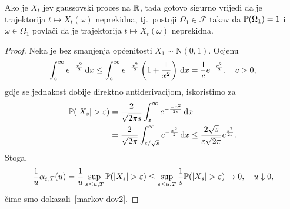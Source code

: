 \documentclass[main.tex]{subfiles}
\begin{document}
\begin{teorem}\label{tm:aditgauss}
	Ako je \( X_t \) \levy jev gaussovski proces na \( \R \), tada gotovo sigurno vrijedi da je trajektorija \( t \mapsto X_t(\omega) \) neprekidna, tj.\ postoji \( \Omega_1 \in \mathcal F \) takav da \( \P(\Omega_1)=1 \) i \( \omega\in \Omega_1\) povlači da je trajektorija \( t \mapsto X_t(\omega) \) neprekidna.
\end{teorem}

\begin{proof}
	Neka je bez smanjenja općenitosti \( X_1 \sim \mathrm N(0,1) \). Ocjenu
	\[
		\int_c^\infty e^{-\frac{x^2}2} \D x \le
		\int_c^\infty e^{-\frac{x^2}2} \left( 1 + \frac 1{x^2} \right) \D x
		= \frac 1c e^{-\frac{c^2}2}, \quad c > 0,
	\]
	gdje se jednakost dobije direktno antiderivacijom, iskoristimo za
	\begin{align}
		\P(\abs{X_s} > \varepsilon) & = \frac 2{\sqrt{2\pi s}} \int_\varepsilon^\infty e^{-\frac{-x^2}{2s}} \D x      \\
		                            & = \frac 2{\sqrt{2 \pi}} \int_{\varepsilon/\sqrt s}^\infty e^{-\frac{x^2}2} \D x
		\le \frac{2 \sqrt s}{\varepsilon \sqrt{2\pi}} e^{\frac{\varepsilon^2}{2s}}.
	\end{align}
	Stoga,
	\begin{equation}
		\frac 1u \alpha_{\varepsilon, T}(u) =
		\frac 1u \sup\limits_{s \le u, T} \P(\abs{X_s} > \varepsilon) \le
		\sup\limits_{s \le u, T} \frac 1s \P(\abs{X_s} > \varepsilon) \un, \quad u \downarrow 0,
	\end{equation}
	čime smo dokazali~\eqref{markov-dov2}.
\end{proof}
\end{document}
